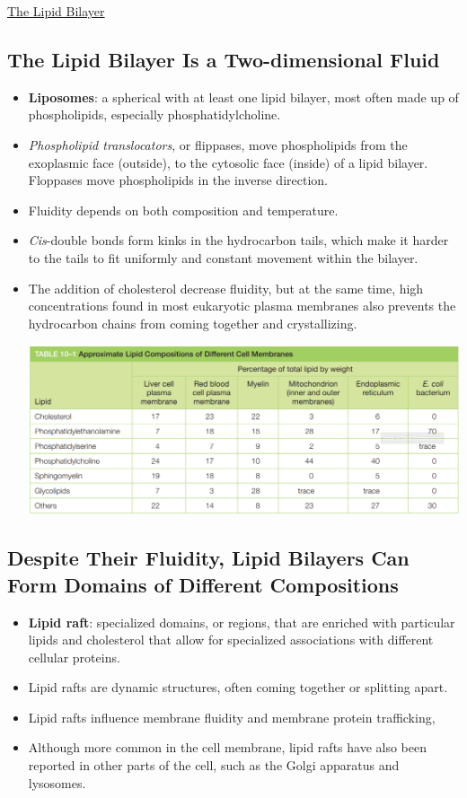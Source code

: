 \documentclass[12pt,letterpaper]{article}
\begin{document}
\begin{secbox}{\hyperlink{10}{The Lipid Bilayer}}
{    \hypertarget{10.2}{\subsection*{The Lipid Bilayer Is a Two-dimensional Fluid}}
    \begin{itemize}   
        \item \textbf{Liposomes}: a spherical with at least one lipid bilayer, most often made up of phospholipids, especially phosphatidylcholine.
        \item \textit{Phospholipid translocators}, or flippases, move phospholipids from the exoplasmic face (outside), to the cytosolic face (inside) of a lipid bilayer. Floppases move phospholipids in the inverse direction. 
        \item Fluidity depends on both composition and temperature. 
        \item \textit{Cis}-double bonds form kinks in the hydrocarbon tails, which make it harder to the tails to fit uniformly and constant movement within the bilayer.
        \item The addition of cholesterol decrease fluidity, but at the same time, high concentrations found in most eukaryotic plasma membranes also prevents the hydrocarbon chains from coming together and crystallizing.\par
        \includegraphics[width=\linewidth]{images/table_10_1.png}
    \end{itemize}

    \hypertarget{10.3}{\subsection*{Despite Their Fluidity, Lipid Bilayers Can Form Domains of Different Compositions}}
    \begin{itemize}
        \item \textbf{Lipid raft}: specialized domains, or regions, that are enriched with particular lipids and cholesterol that allow for specialized associations with different cellular proteins. 
        \item Lipid rafts are dynamic structures, often coming together or splitting apart.\
        \item Lipid rafts influence membrane fluidity and membrane protein trafficking,
        \item Although more common in the cell membrane, lipid rafts have also been reported in other parts of the cell, such as the Golgi apparatus and lysosomes.
    \end{itemize}

}
\end{secbox}
\end{document}
